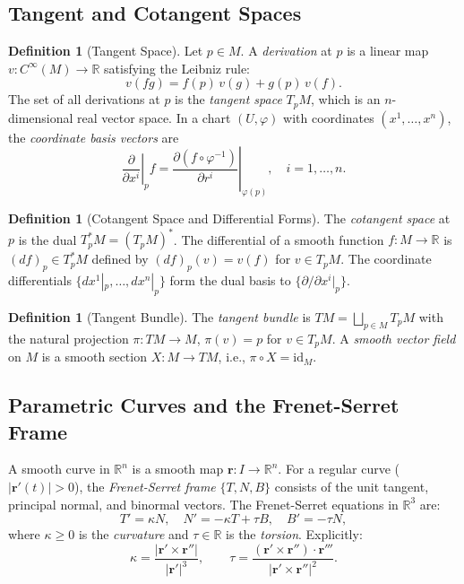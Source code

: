 \documentclass[12pt,a4paper]{amsart}
\theoremstyle{definition}
\newtheorem{definition}[theorem]{Definition}
\begin{document}
\subsection{Tangent and Cotangent Spaces}

\begin{definition}[Tangent Space]
Let $p \in M$. A \emph{derivation} at $p$ is a linear map
$v: C^\infty(M) \to \mathbb{R}$ satisfying the Leibniz rule:
\[
  v(fg) = f(p)\,v(g) + g(p)\,v(f).
\]
The set of all derivations at $p$ is the \emph{tangent space} $T_pM$, which
is an $n$-dimensional real vector space. In a chart $(U, \varphi)$ with
coordinates $(x^1, \ldots, x^n)$, the \emph{coordinate basis vectors} are
\[
  \left.\frac{\partial}{\partial x^i}\right|_p f
  = \left.\frac{\partial (f \circ \varphi^{-1})}{\partial r^i}\right|_{\varphi(p)},
  \quad i = 1, \ldots, n.
\]
\end{definition}

\begin{definition}[Cotangent Space and Differential Forms]
The \emph{cotangent space} at $p$ is the dual $T_p^*M = (T_pM)^*$.
The differential of a smooth function $f: M \to \mathbb{R}$ is
$(df)_p \in T_p^*M$ defined by $(df)_p(v) = v(f)$ for $v \in T_pM$.
The coordinate differentials $\{dx^1|_p, \ldots, dx^n|_p\}$ form the
dual basis to $\{\partial/\partial x^i|_p\}$.
\end{definition}

\begin{definition}[Tangent Bundle]
The \emph{tangent bundle} is $TM = \bigsqcup_{p \in M} T_pM$ with the natural
projection $\pi: TM \to M$, $\pi(v) = p$ for $v \in T_pM$. A \emph{smooth
vector field} on $M$ is a smooth section $X: M \to TM$, i.e., $\pi \circ X = \mathrm{id}_M$.
\end{definition}

\subsection{Parametric Curves and the Frenet-Serret Frame}

A smooth curve in $\mathbb{R}^n$ is a smooth map $\mathbf{r}: I \to \mathbb{R}^n$.
For a regular curve ($|\mathbf{r}'(t)| > 0$), the \emph{Frenet-Serret frame}
$\{T, N, B\}$ consists of the unit tangent, principal normal, and binormal vectors.
The Frenet-Serret equations in $\mathbb{R}^3$ are:
\[
  T' = \kappa N, \quad N' = -\kappa T + \tau B, \quad B' = -\tau N,
\]
where $\kappa \geq 0$ is the \emph{curvature} and $\tau \in \mathbb{R}$ is
the \emph{torsion}. Explicitly:
\[
  \kappa = \frac{|\mathbf{r}' \times \mathbf{r}''|}{|\mathbf{r}'|^3},
  \qquad
  \tau = \frac{(\mathbf{r}' \times \mathbf{r}'') \cdot \mathbf{r}'''}{|\mathbf{r}' \times \mathbf{r}''|^2}.
\]
\end{document}
